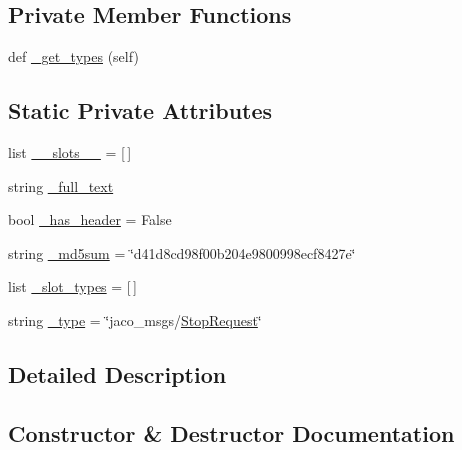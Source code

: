 \subsection*{Private Member Functions}
\begin{DoxyCompactItemize}
\item 
def \hyperlink{classjaco__msgs_1_1srv_1_1__Stop_1_1StopRequest_aebf1b0480f187ad39fc86bf1df46633c}{\+\_\+get\+\_\+types} (self)
\end{DoxyCompactItemize}
\subsection*{Static Private Attributes}
\begin{DoxyCompactItemize}
\item 
list \hyperlink{classjaco__msgs_1_1srv_1_1__Stop_1_1StopRequest_a3311865e7e76b1e85a876f81e2b81f43}{\+\_\+\+\_\+slots\+\_\+\+\_\+} = \mbox{[}$\,$\mbox{]}
\item 
string \hyperlink{classjaco__msgs_1_1srv_1_1__Stop_1_1StopRequest_aef7736883267993053cb75b4bc63336d}{\+\_\+full\+\_\+text}
\item 
bool \hyperlink{classjaco__msgs_1_1srv_1_1__Stop_1_1StopRequest_a14182ef8b20fc56d1989f7a0cd4d6a48}{\+\_\+has\+\_\+header} = False
\item 
string \hyperlink{classjaco__msgs_1_1srv_1_1__Stop_1_1StopRequest_a0dd5352b33def693ef7e404ed624950e}{\+\_\+md5sum} = \char`\"{}d41d8cd98f00b204e9800998ecf8427e\char`\"{}
\item 
list \hyperlink{classjaco__msgs_1_1srv_1_1__Stop_1_1StopRequest_a7b1a0eda37fa2badce0000b0a554e4f3}{\+\_\+slot\+\_\+types} = \mbox{[}$\,$\mbox{]}
\item 
string \hyperlink{classjaco__msgs_1_1srv_1_1__Stop_1_1StopRequest_a5ce51a377c3c216314931ea5d763ecb9}{\+\_\+type} = \char`\"{}jaco\+\_\+msgs/\hyperlink{classjaco__msgs_1_1srv_1_1__Stop_1_1StopRequest}{Stop\+Request}\char`\"{}
\end{DoxyCompactItemize}


\subsection{Detailed Description}


\subsection{Constructor \& Destructor Documentation}
